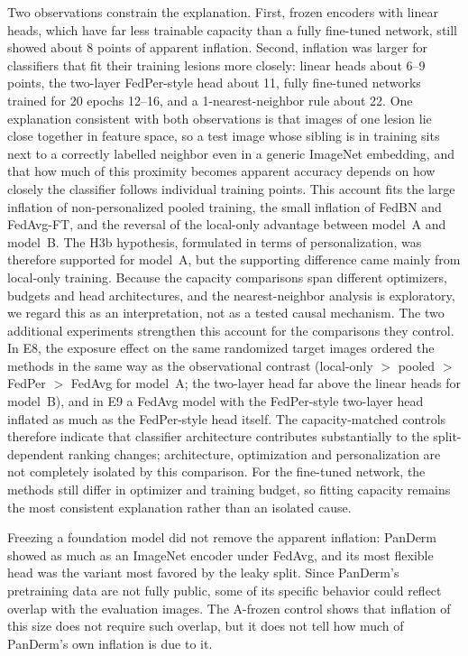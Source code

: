 \documentclass[VANCOUVER,Times1COL]{WileyNJDv5}
\begin{document}
Two observations constrain the explanation. First, frozen encoders with linear heads, which have far less
trainable capacity than a fully fine-tuned network, still showed about 8 points of apparent inflation.
Second, inflation was larger for classifiers that fit their training lesions more closely: linear heads
about 6--9 points, the two-layer FedPer-style head about 11, fully fine-tuned networks trained for 20 epochs
12--16, and a 1-nearest-neighbor rule about 22. One explanation consistent with both observations is that
images of one lesion lie close together in feature space, so a test image whose sibling is in training sits
next to a correctly labelled neighbor even in a generic ImageNet embedding, and that how much of this
proximity becomes apparent accuracy depends on how closely the classifier follows individual training
points. This account fits the large inflation of non-personalized pooled training, the small inflation of
FedBN and FedAvg-FT, and the reversal of the local-only advantage between model~A and model~B. The H3b
hypothesis, formulated in terms of personalization, was therefore supported for model~A, but the
supporting difference came mainly from local-only training. Because the capacity comparisons span
different optimizers, budgets and head architectures, and the nearest-neighbor analysis is exploratory,
we regard this as an interpretation, not as a tested causal mechanism. The two additional experiments strengthen this account for the
comparisons they control. In E8, the exposure effect on the same randomized target images ordered the
methods in the same way as the observational contrast (local-only $>$ pooled $>$ FedPer $>$ FedAvg for
model~A; the two-layer head far above the linear heads for model~B), and in E9 a FedAvg model with the
FedPer-style two-layer head inflated as much as the FedPer-style head itself. The capacity-matched controls therefore indicate that classifier architecture contributes substantially to the split-dependent ranking changes; architecture, optimization and personalization are not completely isolated by this comparison. For the fine-tuned
network, the methods still differ in optimizer and training budget, so fitting capacity remains the most
consistent explanation rather than an isolated cause.

Freezing a foundation model did not remove the apparent inflation: PanDerm showed as much as an ImageNet
encoder under FedAvg, and its most flexible head was the variant most favored by the leaky split. Since
PanDerm's pretraining data are not fully public, some of its specific behavior could reflect overlap with
the evaluation images. The A-frozen control shows that inflation of this size does not require such
overlap, but it does not tell how much of PanDerm's own inflation is due to it.
\end{document}
